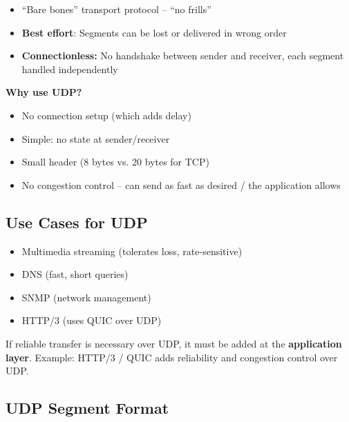 \begin{keybox}
\begin{itemize}[noitemsep]
    \item ``Bare bones'' transport protocol -- ``no frills''
    \item \textbf{Best effort}: Segments can be lost or delivered in wrong order
    \item \textbf{Connectionless:} No handshake between sender and receiver, each segment handled independently
\end{itemize}

\textbf{Why use UDP?}
\begin{itemize}[noitemsep]
    \item No connection setup (which adds delay)
    \item Simple: no state at sender/receiver
    \item Small header (8 bytes vs. 20 bytes for TCP)
    \item No congestion control -- can send as fast as desired / the application allows
\end{itemize}
\end{keybox}

\subsection{Use Cases for UDP}

\begin{itemize}[noitemsep]
    \item Multimedia streaming (tolerates loss, rate-sensitive)
    \item DNS (fast, short queries)
    \item SNMP (network management)
    \item HTTP/3 (uses QUIC over UDP)
\end{itemize}

\begin{warnbox}
If reliable transfer is necessary over UDP, it must be added at the \textbf{application layer}. Example: HTTP/3 / QUIC adds reliability and congestion control over UDP.
\end{warnbox}

\subsection{UDP Segment Format}

